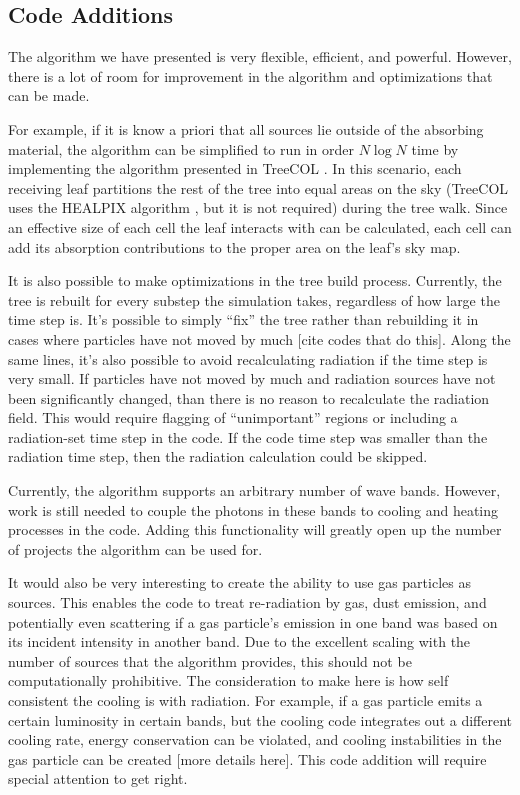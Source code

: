 \subsection{Code Additions}
\label{sec:codeadditions}

The algorithm we have presented is very flexible, efficient, and powerful. However, there is a lot of room for improvement in the algorithm and optimizations that can be made.

For example, if it is know a priori that all sources lie outside of the absorbing material, the algorithm can be simplified to run in order $N\log{N}$ time by implementing the algorithm presented in TreeCOL \citep{clarkEt12}. In this scenario, each receiving leaf partitions the rest of the tree into equal areas on the sky (TreeCOL uses the HEALPIX algorithm \citep{gorskiEt05}, but it is not required) during the tree walk. Since an effective size of each cell the leaf interacts with can be calculated, each cell can add its absorption contributions to the proper area on the leaf's sky map.

It is also possible to make optimizations in the tree build process. Currently, the tree is rebuilt for every substep the simulation takes, regardless of how large the time step is. It's possible to simply ``fix'' the tree rather than rebuilding it in cases where particles have not moved by much [cite codes that do this]. Along the same lines, it's also possible to avoid recalculating radiation if the time step is very small. If particles have not moved by much and radiation sources have not been significantly changed, than there is no reason to recalculate the radiation field. This would require flagging of ``unimportant'' regions or including a radiation-set time step in the code. If the code time step was smaller than the radiation time step, then the radiation calculation could be skipped.

Currently, the algorithm supports an arbitrary number of wave bands. However, work is still needed to couple the photons in these bands to cooling and heating processes in the code. Adding this functionality will greatly open up the number of projects the algorithm can be used for.

It would also be very interesting to create the ability to use gas particles as sources. This enables the code to treat re-radiation by gas, dust emission, and potentially even scattering if a gas particle's emission in one band was based on its incident intensity in another band. Due to the excellent scaling with the number of sources that the algorithm provides, this should not be computationally prohibitive. The consideration to make here is how self consistent the cooling is with radiation. For example, if a gas particle emits a certain luminosity in certain bands, but the cooling code integrates out a different cooling rate, energy conservation can be violated, and cooling instabilities in the gas particle can be created [more details here]. This code addition will require special attention to get right.

